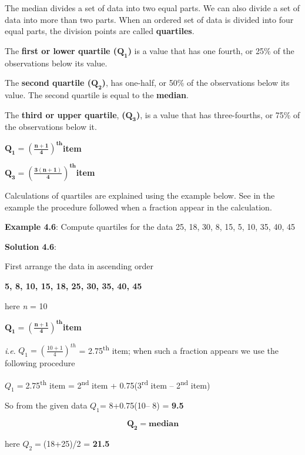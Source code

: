 \documentclass[
]{book}
\begin{document}
The median divides a set of data into two equal parts. We can also
divide a set of data into more than two parts. When an ordered set of
data is divided into four equal parts, the division points are called
\textbf{quartiles}.

The \textbf{first or lower quartile (}\(\mathbf{Q}_{\mathbf{1}}\)\textbf{)} is a
value that has one fourth, or 25\% of the observations below its value.

The \textbf{second quartile (}\(\mathbf{Q}_{\mathbf{2}}\)\textbf{)}, has one-half,
or 50\% of the observations below its value. The second quartile is equal
to the \textbf{median}.

The \textbf{third or upper quartile}, \textbf{(}\(\mathbf{Q}_{\mathbf{3}}\)\textbf{)}, is
a value that has three-fourths, or 75\% of the observations below it.

\(\mathbf{Q}_{\mathbf{1}}\mathbf{=}\left( \frac{\mathbf{n + 1}}{\mathbf{4}} \right)^{\mathbf{\text{th}}}\)\textbf{item}

\(\mathbf{Q}_{\mathbf{3}}\mathbf{=}\left( \frac{\mathbf{3(n + 1)}}{\mathbf{4}} \right)^{\mathbf{\text{th}}}\)\textbf{item}

Calculations of quartiles are explained using the example below. See in
the example the procedure followed when a fraction appear in the
calculation.

\textbf{Example 4.6}: Compute quartiles for the data 25, 18, 30, 8, 15, 5,
10, 35, 40, 45

\textbf{Solution 4.6}:

First arrange the data in ascending order

\textbf{5, 8, 10, 15, 18, 25, 30, 35, 40, 45}

here \emph{n} = 10

\(\mathbf{Q}_{\mathbf{1}}\mathbf{=}\left(\frac{\mathbf{n + 1}}{\mathbf{4}} \right)^{\mathbf{\text{th}}}\)\textbf{item}

\emph{i}.\emph{e}. \(Q_{1} = \left( \frac{10 + 1}{4} \right)^{th}\) = 2.75\textsuperscript{th} item;
when such a fraction appears we use the following procedure

\(Q_{1} =\)2.75\textsuperscript{th} item = 2\textsuperscript{nd} item + 0.75(3\textsuperscript{rd} item -- 2\textsuperscript{nd}
item)

So from the given data \(Q_{1}\)= 8+0.75(10-- 8) = \textbf{9.5}

\[\mathbf{Q}_{\mathbf{2}}\mathbf{= median}\]

here \(Q_{2} =\)(18+25)/2 = \textbf{21.5}
\end{document}
